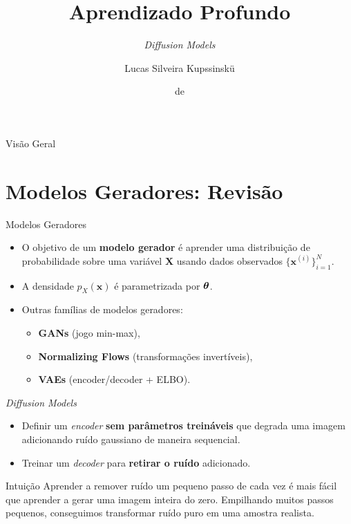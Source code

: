\documentclass[aspectratio=169,xcolor=dvipsnames]{beamer}
\title{Aprendizado Profundo}
\subtitle{\textit{Diffusion Models}}
\author{Lucas Silveira Kupssinskü}
\institute
{
    Machine Learning Theory and Applications Laboratory \\
    PUCRS
}
\date{\mespor de \the\year}
\begin{document}
  \begin{frame}
    \titlepage
  \end{frame}

  \begin{frame}{Visão Geral}
    \tableofcontents
  \end{frame}

  \section{Modelos Geradores: Revisão}

  \begin{frame}{Modelos Geradores}
    \begin{itemize}
      \item O objetivo de um \textbf{modelo gerador} é aprender uma
      \textcolor{EncRed}{distribuição de probabilidade} sobre uma
      variável $\mathbf{X}$ usando dados observados
      $\{\mathbf{x}^{(i)}\}_{i=1}^{N}$.
      \item A densidade $p_{X}(\mathbf{x})$ é parametrizada por $\bm{\theta}$.
      \item Outras famílias de modelos geradores:
      \begin{itemize}
        \item \textbf{GANs} (jogo min-max),
        \item \textbf{Normalizing Flows} (transformações invertíveis),
        \item \textbf{VAEs} (encoder/decoder + ELBO).
      \end{itemize}
    \end{itemize}
  \end{frame}

  \begin{frame}{\textit{Diffusion Models}}
    \begin{itemize}
      \item Definir um \textcolor{EncRed}{\textit{encoder}
      \textbf{sem parâmetros treináveis}} que degrada uma imagem
      adicionando ruído gaussiano de maneira sequencial.
      \item Treinar um \textcolor{DecBlue}{\textit{decoder}} para
      \textbf{retirar o ruído} adicionado.
    \end{itemize}
    \vspace{0.5em}
    \begin{block}{Intuição}
      Aprender a remover ruído um pequeno passo de cada vez é mais
      fácil que aprender a gerar uma imagem inteira do zero.
      Empilhando muitos passos pequenos, conseguimos transformar ruído
      puro em uma amostra realista.
    \end{block}
  \end{frame}
\end{document}

